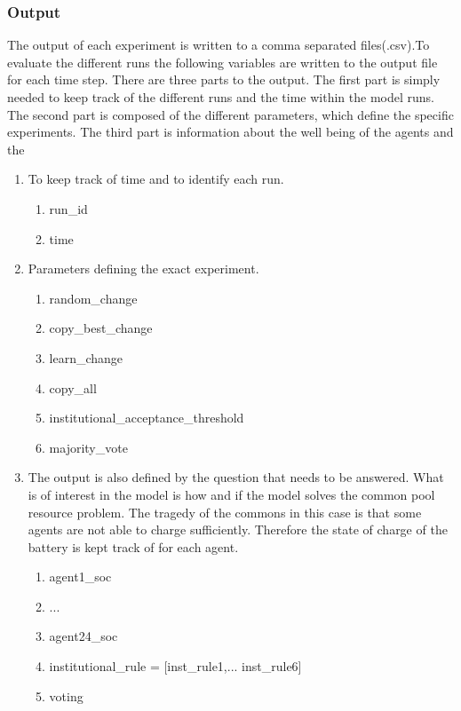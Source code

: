 \documentclass[a4paper]{article}
\begin{document}
\subsubsection{Output}
The output of each experiment is written to a comma separated files(.csv).To evaluate the different runs the following 
variables are written to the output file for each time step. There are three parts to the output. The first part is simply needed 
to keep  track of the different runs and the time within the model runs. The second part is composed of the different parameters, which 
define the specific experiments. The third part is information about the well being of the agents and the \\
\begin{enumerate}
\item To keep track of time and to identify each run. 
\begin{enumerate}
 \item run\_id
 \item time
\end{enumerate}

\item Parameters defining the exact experiment.
\begin{enumerate}
 \item random\_change
 \item copy\_best\_change
 \item learn\_change
 \item copy\_all
 \item institutional\_acceptance\_threshold
 \item majority\_vote
\end{enumerate}

\item The output is also  defined by the question that needs to be answered. What is of interest in the model is how and 
if the model solves the common pool resource problem. The tragedy of the commons in this case is that some agents are 
not able to charge sufficiently. Therefore the state of charge of the battery is kept track of for each agent.


\begin{enumerate}
 \item agent1\_soc
 \item ...
 \item agent24\_soc
 \item institutional\_rule = [inst\_rule1,... inst\_rule6]
 \item voting
\end{enumerate}

\end{enumerate}
\end{document}
